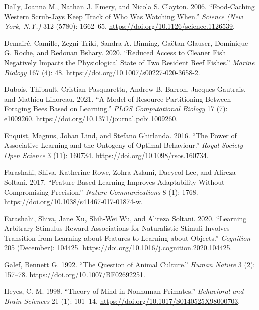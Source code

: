 \documentclass[
  12pt,
]{article}
\newlength{\cslhangindent}
\newlength{\cslentryspacingunit} %
\newenvironment{CSLReferences}[2] %
 {%
  \setlength{\parindent}{0pt}
  \ifodd #1
  \let\oldpar\par
  \def\par{\hangindent=\cslhangindent\oldpar}
  \fi
  \setlength{\parskip}{#2\cslentryspacingunit}
 }%
 {}
\begin{document}
\begin{CSLReferences}{1}{0}
\leavevmode{}%
Dally, Joanna M., Nathan J. Emery, and Nicola S. Clayton. 2006.
{``Food-Caching Western Scrub-Jays Keep Track of Who Was Watching
When.''} \emph{Science (New York, N.Y.)} 312 (5780): 1662--65.
\url{https://doi.org/10.1126/science.1126539}.

\leavevmode{}%
Demairé, Camille, Zegni Triki, Sandra A. Binning, Gaëtan Glauser,
Dominique G. Roche, and Redouan Bshary. 2020. {``Reduced Access to
Cleaner Fish Negatively Impacts the Physiological State of Two Resident
Reef Fishes.''} \emph{Marine Biology} 167 (4): 48.
\url{https://doi.org/10.1007/s00227-020-3658-2}.

\leavevmode{}%
Dubois, Thibault, Cristian Pasquaretta, Andrew B. Barron, Jacques
Gautrais, and Mathieu Lihoreau. 2021. {``A Model of Resource
Partitioning Between Foraging Bees Based on Learning.''} \emph{PLOS
Computational Biology} 17 (7): e1009260.
\url{https://doi.org/10.1371/journal.pcbi.1009260}.

\leavevmode{}%
Enquist, Magnus, Johan Lind, and Stefano Ghirlanda. 2016. {``The Power
of Associative Learning and the Ontogeny of Optimal Behaviour.''}
\emph{Royal Society Open Science} 3 (11): 160734.
\url{https://doi.org/10.1098/rsos.160734}.

\leavevmode{}%
Farashahi, Shiva, Katherine Rowe, Zohra Aslami, Daeyeol Lee, and Alireza
Soltani. 2017. {``Feature-Based Learning Improves Adaptability Without
Compromising Precision.''} \emph{Nature Communications} 8 (1): 1768.
\url{https://doi.org/10.1038/s41467-017-01874-w}.

\leavevmode{}%
Farashahi, Shiva, Jane Xu, Shih-Wei Wu, and Alireza Soltani. 2020.
{``Learning Arbitrary Stimulus-Reward Associations for Naturalistic
Stimuli Involves Transition from Learning about Features to Learning
about Objects.''} \emph{Cognition} 205 (December): 104425.
\url{https://doi.org/10.1016/j.cognition.2020.104425}.

\leavevmode{}%
Galef, Bennett G. 1992. {``The Question of Animal Culture.''}
\emph{Human Nature} 3 (2): 157--78.
\url{https://doi.org/10.1007/BF02692251}.

\leavevmode{}%
Heyes, C. M. 1998. {``Theory of Mind in Nonhuman Primates.''}
\emph{Behavioral and Brain Sciences} 21 (1): 101--14.
\url{https://doi.org/10.1017/S0140525X98000703}.


\end{CSLReferences}
\end{document}
